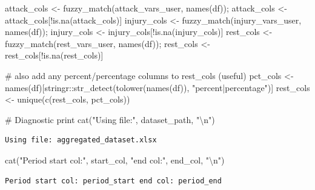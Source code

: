 \documentclass[
  letterpaper,
  DIV=11,
  numbers=noendperiod]{scrartcl}
\newenvironment{Shaded}{\begin{snugshade}}{\end{snugshade}}
\newcommand{\CommentTok}[1]{\textcolor[rgb]{0.37,0.37,0.37}{#1}}
\newcommand{\FunctionTok}[1]{\textcolor[rgb]{0.28,0.35,0.67}{#1}}
\newcommand{\NormalTok}[1]{\textcolor[rgb]{0.00,0.23,0.31}{#1}}
\newcommand{\OtherTok}[1]{\textcolor[rgb]{0.00,0.23,0.31}{#1}}
\newcommand{\SpecialCharTok}[1]{\textcolor[rgb]{0.37,0.37,0.37}{#1}}
\newcommand{\StringTok}[1]{\textcolor[rgb]{0.13,0.47,0.30}{#1}}
\begin{document}
\begin{Shaded}
\begin{Highlighting}[]
\NormalTok{attack\_cols }\OtherTok{\textless{}{-}} \FunctionTok{fuzzy\_match}\NormalTok{(attack\_vars\_user, }\FunctionTok{names}\NormalTok{(df)); attack\_cols }\OtherTok{\textless{}{-}}\NormalTok{ attack\_cols[}\SpecialCharTok{!}\FunctionTok{is.na}\NormalTok{(attack\_cols)]}
\NormalTok{injury\_cols }\OtherTok{\textless{}{-}} \FunctionTok{fuzzy\_match}\NormalTok{(injury\_vars\_user, }\FunctionTok{names}\NormalTok{(df)); injury\_cols }\OtherTok{\textless{}{-}}\NormalTok{ injury\_cols[}\SpecialCharTok{!}\FunctionTok{is.na}\NormalTok{(injury\_cols)]}
\NormalTok{rest\_cols   }\OtherTok{\textless{}{-}} \FunctionTok{fuzzy\_match}\NormalTok{(rest\_vars\_user, }\FunctionTok{names}\NormalTok{(df));   rest\_cols   }\OtherTok{\textless{}{-}}\NormalTok{ rest\_cols[}\SpecialCharTok{!}\FunctionTok{is.na}\NormalTok{(rest\_cols)]}

\CommentTok{\# also add any percent/percentage columns to rest\_cols (useful)}
\NormalTok{pct\_cols }\OtherTok{\textless{}{-}} \FunctionTok{names}\NormalTok{(df)[stringr}\SpecialCharTok{::}\FunctionTok{str\_detect}\NormalTok{(}\FunctionTok{tolower}\NormalTok{(}\FunctionTok{names}\NormalTok{(df)), }\StringTok{"percent|percentage"}\NormalTok{)]}
\NormalTok{rest\_cols }\OtherTok{\textless{}{-}} \FunctionTok{unique}\NormalTok{(}\FunctionTok{c}\NormalTok{(rest\_cols, pct\_cols))}

\CommentTok{\# Diagnostic print}
\FunctionTok{cat}\NormalTok{(}\StringTok{"Using file:"}\NormalTok{, dataset\_path, }\StringTok{"}\SpecialCharTok{\textbackslash{}n}\StringTok{"}\NormalTok{)}
\end{Highlighting}
\end{Shaded}

\begin{verbatim}
Using file: aggregated_dataset.xlsx 
\end{verbatim}

\begin{Shaded}
\begin{Highlighting}[]
\FunctionTok{cat}\NormalTok{(}\StringTok{"Period start col:"}\NormalTok{, start\_col, }\StringTok{"end col:"}\NormalTok{, end\_col, }\StringTok{"}\SpecialCharTok{\textbackslash{}n}\StringTok{"}\NormalTok{)}
\end{Highlighting}
\end{Shaded}

\begin{verbatim}
Period start col: period_start end col: period_end 
\end{verbatim}
\end{document}
